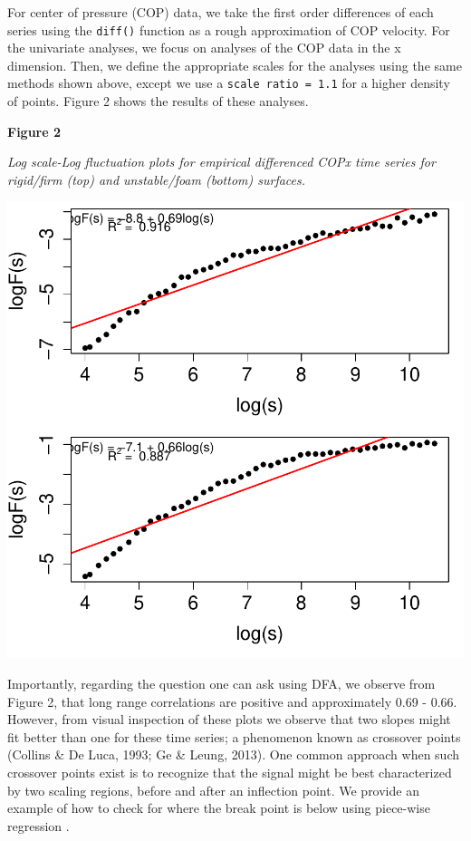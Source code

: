 \documentclass[
  man]{apa6}
\begin{document}
For center of pressure (COP) data, we take the first order differences
of each series using the \texttt{diff()} function as a rough approximation of
COP velocity. For the univariate analyses, we focus on analyses of the
COP data in the x dimension. Then, we define the appropriate scales for
the analyses using the same methods shown above, except we use a
\texttt{scale\ ratio\ =\ 1.1} for a higher density of points. Figure 2 shows the
results of these analyses.

\textbf{Figure 2}

\emph{Log scale-Log fluctuation plots for empirical differenced COPx time
series for rigid/firm (top) and unstable/foam (bottom) surfaces.}

\includegraphics{fractal_regression_paper_brm_files/figure-latex/unnamed-chunk-5-1.pdf}

Importantly, regarding the question one can ask using DFA, we observe
from Figure 2, that long range correlations are positive and
approximately 0.69 -
0.66. However, from visual inspection of
these plots we observe that two slopes might fit better than one for
these time series; a phenomenon known as crossover points (Collins \& De Luca, 1993; Ge \& Leung, 2013). One common approach when such crossover points exist is to
recognize that the signal might be best characterized by two scaling
regions, before and after an inflection point. We provide an example of
how to check for where the break point is below using piece-wise
regression .
\end{document}
